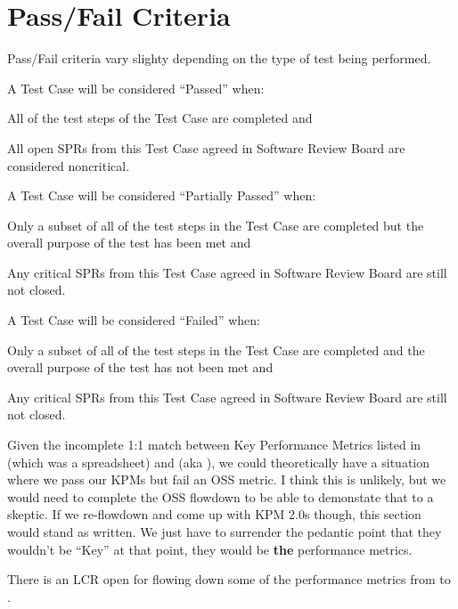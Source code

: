 
\section{Pass/Fail Criteria}

Pass/Fail criteria vary slighty depending on the type of test being performed.


A Test Case will be considered ``Passed'' when:
\begin{itemize_single}
\item All of the test steps of the Test Case are completed and
\item All open SPRs from this Test Case agreed in Software Review Board are considered noncritical.
\end{itemize_single}

A Test Case will be considered ``Partially Passed'' when:
\begin{itemize_single}
\item Only a subset of all of the test steps in the Test Case are completed but the overall purpose of the test has been met and
\item Any critical SPRs from this Test Case agreed in Software Review Board are still not closed.
\end{itemize_single}

A Test Case will be considered ``Failed'' when:
\begin{itemize_single}
\item Only a subset of all of the test steps in the Test Case are completed and the overall purpose of the test has not been met and
\item Any critical SPRs from this Test Case agreed in Software Review Board are still not closed.
\end{itemize_single}


\begin{note}
Given the incomplete 1:1 match between Key Performance Metrics listed in  (which was a spreadsheet) and  (aka \OSS), we could theoretically have a situation where we pass our KPMs but fail an OSS metric. I think this is unlikely, but we would need to complete the OSS flowdown to be able to demonstate that to a skeptic. If we re-flowdown and come up with KPM 2.0s though, this section would stand as written. We just have to surrender the pedantic point that they wouldn't be ``Key'' at that point, they would be \textbf{the} performance metrics.
\end{note}

\begin{note}
  There is an LCR open for flowing down some of the performance metrics from \LSR to \OSS.
\end{note}

